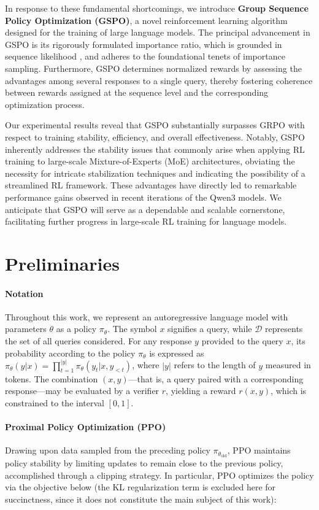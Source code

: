 In response to these fundamental shortcomings, we introduce \textbf{Group Sequence Policy Optimization (GSPO)}, a novel reinforcement learning algorithm designed for the training of large language models. The principal advancement in GSPO is its rigorously formulated importance ratio, which is grounded in sequence likelihood \citep{click}, and adheres to the foundational tenets of importance sampling. Furthermore, GSPO determines normalized rewards by assessing the advantages among several responses to a single query, thereby fostering coherence between rewards assigned at the sequence level and the corresponding optimization process.

Our experimental results reveal that GSPO substantially surpasses GRPO with respect to training stability, efficiency, and overall effectiveness. Notably, GSPO inherently addresses the stability issues that commonly arise when applying RL training to large-scale Mixture-of-Experts (MoE) architectures, obviating the necessity for intricate stabilization techniques and indicating the possibility of a streamlined RL framework. These advantages have directly led to remarkable performance gains observed in recent iterations of the Qwen3 models. We anticipate that GSPO will serve as a dependable and scalable cornerstone, facilitating further progress in large-scale RL training for language models.

\section{Preliminaries}

\paragraph{Notation}
Throughout this work, we represent an autoregressive language model with parameters $\theta$ as a policy $\pi_\theta$.
The symbol $x$ signifies a query, while $\mathcal{D}$ represents the set of all queries considered. For any response $y$ provided to the query $x$, its probability according to the policy $\pi_\theta$ is expressed as $\pi_\theta (y | x)=\prod_{t=1}^{|y|} \pi_\theta (y_t | x, y_{<t} )$, where $|y|$ refers to the length of $y$ measured in tokens. The combination $(x, y)$—that is, a query paired with a corresponding response—may be evaluated by a verifier $r$, yielding a reward $r(x, y)$, which is constrained to the interval $[ 0, 1 ]$.

\paragraph{Proximal Policy Optimization (PPO)} Drawing upon data sampled from the preceding policy $\pi_{\theta_\text{old}}$, PPO \citep{ppo} maintains policy stability by limiting updates to remain close to the previous policy, accomplished through a clipping strategy. In particular, PPO optimizes the policy via the objective below (the KL regularization term is excluded here for succinctness, since it does not constitute the main subject of this work):

